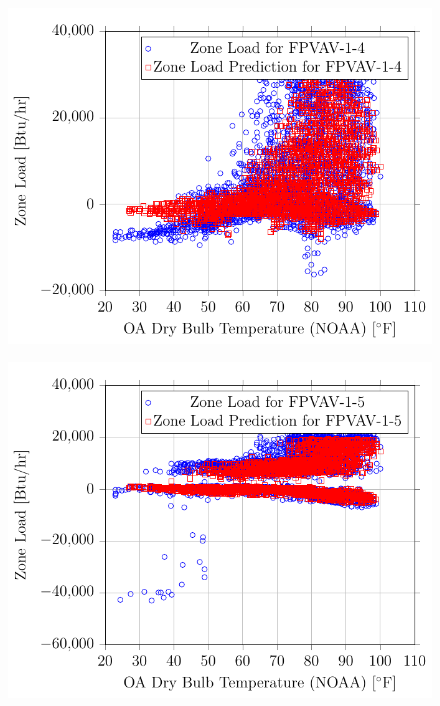 \begin{figure}
\centering
\includegraphics[]{Plots/29/2017-06-27-1358-BtuhrvsOADryBulbTemperatureNOAAF.pdf}
\caption{}
\label{fig:2017-06-27-1358-BtuhrvsOADryBulbTemperatureNOAAF}
\end{figure}

\begin{figure}
\centering
\includegraphics[]{Plots/30/2017-06-27-1359-BtuhrvsOADryBulbTemperatureNOAAF.pdf}
\caption{}
\label{fig:2017-06-27-1359-BtuhrvsOADryBulbTemperatureNOAAF}
\end{figure}

